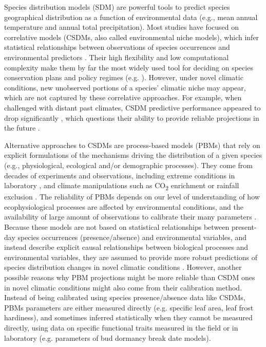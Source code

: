 \documentclass[pdflatex, sn-nature]{sn-jnl}%
\begin{document}
Species distribution models (SDM) are powerful tools to predict species geographical distribution as a function of environmental data (e.g., mean annual temperature and annual total precipitation). Most studies have focused on correlative models (CSDMs, also called environmental niche models), which infer statistical relationships between observations of species occurrences and environmental predictors \cite{Dormann2012}. Their high flexibility and low computational complexity make them by far the most widely used tool for deciding on species conservation plans and policy regimes (e.g. \cite{Hanewinkel2013}). However, under novel climatic conditions, new unobserved portions of a species’ climatic niche may appear, which are not captured by these correlative approaches. For example, when challenged with distant past climates, CSDM predictive performance appeared to drop significantly \cite{Maguire2016}, which questions their ability to provide reliable projections in the future \cite{Fitzpatrick2018}. 

Alternative approaches to CSDMs are process-based models (PBMs) that rely on explicit formulations of the mechanisms driving the distribution of a given species (e.g., physiological, ecological and/or demographic processes). They come from decades of experiments and observations, including extreme conditions in laboratory \cite{Seehausen2017}, and climate manipulations such as CO\textsubscript{2} enrichment \cite{Jiang2020} or rainfall exclusion \cite{Gavinet2019}. The reliability of PBMs depends on our level of understanding of how ecophysiological processes are affected by environmental conditions, and the availability of large amount of observations to calibrate their many parameters \cite{Evans2016}. Because these models are not based on statistical relationships between present-day species occurrences (presence/absence) and environmental variables, and instead describe explicit causal relationships between biological processes and environmental variables, they are assumed to provide more robust predictions of species distribution changes in novel climatic conditions  \cite{Evans2012, Singer2016}. However, another possible reasons why PBM projections might be more reliable than CSDM ones in novel climatic conditions might also come from their calibration method. Instead of being calibrated using species presence/absence data like CSDMs, PBMs parameters are either measured directly (e.g. specific leaf area, leaf frost hardiness), and sometimes inferred statistically when they cannot be measured directly, using data on specific functional traits measured in the field or in laboratory (e.g. parameters of bud dormancy break date models). 
\end{document}
